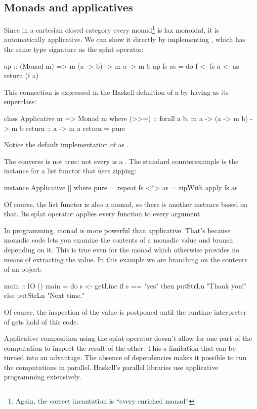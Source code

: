 \documentclass[DaoFP]{subfiles}
\begin{document}
\subsection{Monads and applicatives}

Since in a cartesian closed category every monad\footnote{Again, the correct incantation is ``every enriched monad''} is lax monoidal, it is automatically applicative. We can show it directly by implementing , which has the same type signature as the splat operator:
\begin{haskell}
ap :: (Monad m) => m (a -> b) -> m a -> m b
ap fs as = do 
    f <- fs
    a <- as
    return (f a) 
\end{haskell}

This connection is expressed in the Haskell definition of a  by having  as its superclass:
\begin{haskell}
class Applicative m => Monad m where
    (>>=)       :: forall a b. m a -> (a -> m b) -> m b
    return      :: a -> m a
    return      = pure
\end{haskell}
Notice the default implementation of  as . 

The converse is not true: not every  is a . The standard counterexample is the  instance for a list functor that uses zipping:
\begin{haskell}
instance Applicative [] where
  pure = repeat
  fs <*> as = zipWith apply fs as
\end{haskell}
Of course, the list functor is also a monad, so there is another  instance based on that. Its splat operator applies every function to every argument.

In programming, monad is more powerful than applicative. That's because monadic code lets you examine the contents of a monadic value and branch depending on it. This is true even for the  monad which otherwise provides no means of extracting the value. In this example we are branching on the contents of an  object:
\begin{haskell}
main :: IO ()
main = do
  s <- getLine
  if s == "yes"
  then putStrLn "Thank you!"
  else putStrLn "Next time."
\end{haskell}
Of course, the inspection of the value is postponed until the runtime interpreter of  gets hold of this code. 

Applicative composition using the splat operator doesn't allow for one part of the computation to inspect the result of the other. This a limitation that can be turned into an advantage. The absence of dependencies makes it possible to run the computations in parallel.  Haskell's parallel libraries use applicative programming extensively.
\end{document}
